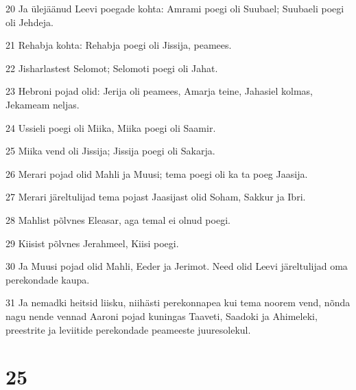 \par 20 Ja ülejäänud Leevi poegade kohta: Amrami poegi oli Suubael; Suubaeli poegi oli Jehdeja.
\par 21 Rehabja kohta: Rehabja poegi oli Jissija, peamees.
\par 22 Jisharlastest Selomot; Selomoti poegi oli Jahat.
\par 23 Hebroni pojad olid: Jerija oli peamees, Amarja teine, Jahasiel kolmas, Jekameam neljas.
\par 24 Ussieli poegi oli Miika, Miika poegi oli Saamir.
\par 25 Miika vend oli Jissija; Jissija poegi oli Sakarja.
\par 26 Merari pojad olid Mahli ja Muusi; tema poegi oli ka ta poeg Jaasija.
\par 27 Merari järeltulijad tema pojast Jaasijast olid Soham, Sakkur ja Ibri.
\par 28 Mahlist põlvnes Eleasar, aga temal ei olnud poegi.
\par 29 Kiisist põlvnes Jerahmeel, Kiisi poegi.
\par 30 Ja Muusi pojad olid Mahli, Eeder ja Jerimot. Need olid Leevi järeltulijad oma perekondade kaupa.
\par 31 Ja nemadki heitsid liisku, niihästi perekonnapea kui tema noorem vend, nõnda nagu nende vennad Aaroni pojad kuningas Taaveti, Saadoki ja Ahimeleki, preestrite ja leviitide perekondade peameeste juuresolekul.

\chapter{25}

